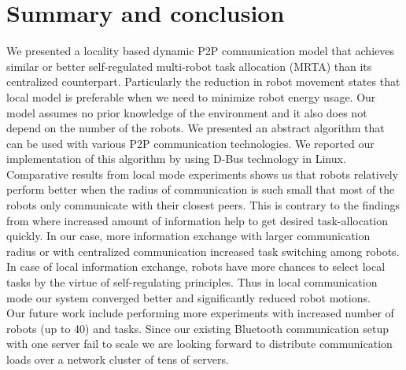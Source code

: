 \section{Summary and conclusion}
\label{sec:conc}
We presented a locality based dynamic P2P communication model that achieves similar or better self-regulated multi-robot task allocation (MRTA) than its centralized counterpart. Particularly the reduction in robot movement states that local model is preferable when we need to minimize robot energy usage. Our model assumes no prior knowledge of the environment and it also does not depend on the number of the robots. We presented an abstract algorithm that can be used with various P2P communication technologies. We reported our implementation of this algorithm   by using  D-Bus technology in Linux. Comparative results from local mode experiments shows us that robots relatively perform better when the radius of communication is such small that most of the robots only communicate with their closest peers. This is contrary to the findings from \cite{Rutishauser, Epuck} where increased amount of information help to get desired task-allocation quickly. In our case, more information exchange with larger communication radius or with centralized communication increased task switching among robots. In case of local information exchange, robots have more chances to select local tasks by the virtue of self-regulating principles. Thus in local communication mode our system converged better and significantly reduced robot motions.\\ 
Our future work include performing more experiments with increased number of robots (up to 40) and tasks. Since our existing Bluetooth communication setup with one server fail to scale we are looking forward to distribute communication loads over a network cluster of tens of servers.
